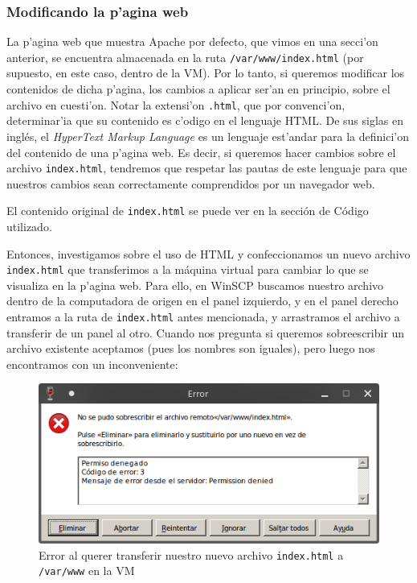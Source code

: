\documentclass[11pt]{article}
\begin{document}
	\subsubsection{Modificando la p'agina web}

	La p'agina web que muestra Apache por defecto, que vimos en una secci'on anterior, se encuentra almacenada en la ruta \verb|/var/www/index.html| (por supuesto, en este caso, dentro de la VM). Por lo tanto, si queremos modificar los contenidos de dicha p'agina, los cambios a aplicar ser'an en principio, sobre el archivo en cuesti'on. Notar la extensi'on \texttt{.html}, que por convenci'on, determinar'ia que su contenido es c'odigo en el lenguaje HTML. De sus siglas en inglés, el \textit{HyperText Markup Language} es un lenguaje est'andar para la definici'on del contenido de una p'agina web. Es decir, si queremos hacer cambios sobre el archivo \texttt{index.html}, tendremos que respetar las pautas de este lenguaje para que nuestros cambios sean correctamente comprendidos por un navegador web. 
	
	El contenido original de \texttt{index.html} se puede ver en la sección de Código utilizado. 
	
	Entonces, investigamos sobre el uso de HTML y confeccionamos un nuevo archivo \texttt{index.html} que transferimos a la máquina virtual para cambiar lo que se visualiza en la p'agina web. Para ello, en WinSCP buscamos nuestro archivo dentro de la computadora de origen en el panel izquierdo, y en el panel derecho entramos a la ruta de \texttt{index.html} antes mencionada, y arrastramos el archivo a transferir de un panel al otro. Cuando nos pregunta si queremos sobreescribir un archivo existente aceptamos (pues los nombres son iguales), pero luego nos encontramos con un inconveniente:
	
	\begin{figure}[H]
		\centering \captionsetup{justification=centering}
		\includegraphics[width=.8\linewidth]{Images/WinSCP/fig4}
		\caption{Error al querer transferir nuestro nuevo archivo \texttt{index.html} a \texttt{/var/www} en la VM}
	\end{figure}
\end{document}
